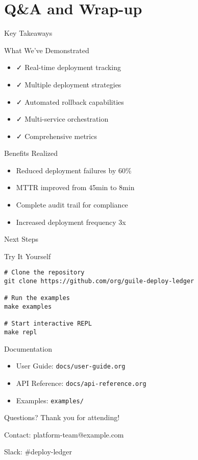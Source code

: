 \documentclass[presentation]{beamer}
\begin{document}
\section{Q\&A and Wrap-up}
\label{sec:org9cb17c8}
\begin{frame}[label={sec:org8568e39}]{Key Takeaways}
\begin{block}{What We've Demonstrated}
\begin{itemize}
\item ✓ Real-time deployment tracking
\item ✓ Multiple deployment strategies
\item ✓ Automated rollback capabilities
\item ✓ Multi-service orchestration
\item ✓ Comprehensive metrics
\end{itemize}
\end{block}
\begin{block}{Benefits Realized}
\begin{itemize}
\item Reduced deployment failures by 60\%
\item MTTR improved from 45min to 8min
\item Complete audit trail for compliance
\item Increased deployment frequency 3x
\end{itemize}
\end{block}
\end{frame}
\begin{frame}[label={sec:org8dcc53f},fragile]{Next Steps}
 \begin{block}{Try It Yourself}
\begin{verbatim}
# Clone the repository
git clone https://github.com/org/guile-deploy-ledger

# Run the examples
make examples

# Start interactive REPL
make repl
\end{verbatim}
\end{block}
\begin{block}{Documentation}
\begin{itemize}
\item User Guide: \texttt{docs/user-guide.org}
\item API Reference: \texttt{docs/api-reference.org}
\item Examples: \texttt{examples/}
\end{itemize}
\end{block}
\end{frame}
\begin{frame}[label={sec:orgf37d445}]{Questions?}
Thank you for attending!

Contact: platform-team@example.com

Slack: \#deploy-ledger
\end{frame}
\end{document}
